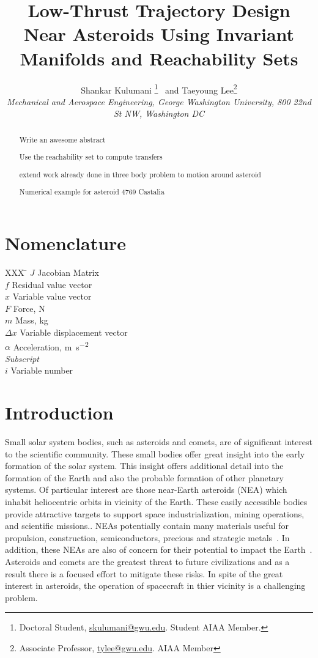 \documentclass[]{aiaa-tc}%
\title{Low-Thrust Trajectory Design Near Asteroids Using Invariant Manifolds and Reachability Sets}
\author{
  Shankar Kulumani\thanksibid{1}%
    \thanks{Doctoral Student, \href{mailto:skulumani@gwu.edu}{skulumani@gwu.edu}. Student AIAA Member.}
  \ and Taeyoung Lee\thanksibid{2}\thanks{Associate Professor, \href{mailto:tylee@gwu.edu}{tylee@gwu.edu}. AIAA Member}\\
  {\normalsize\itshape
   Mechanical and Aerospace Engineering, George Washington University, 800 22nd St NW, Washington DC }\\
   }
\begin{document}
\maketitle

\begin{abstract}
Write an awesome abstract

Use the reachability set to compute transfers

extend work already done in three body problem to motion around asteroid

Numerical example for asteroid 4769 Castalia
\end{abstract}

\section*{Nomenclature}

\begin{tabbing}
  XXX \= \kill%
  $J$ \> Jacobian Matrix \\
  $f$ \> Residual value vector \\
  $x$ \> Variable value vector \\
  $F$ \> Force, \si{\newton} \\
  $m$ \> Mass, \si{\kilo\gram} \\
  $\Delta x$ \> Variable displacement vector \\
  $\alpha$ \> Acceleration, \si{\meter\per\second\squared} \\[5pt]
  \textit{Subscript}\\
  $i$ \> Variable number \\
\end{tabbing}

\section{Introduction}

Small solar system bodies, such as asteroids and comets, are of significant interest to the scientific community.
These small bodies offer great insight into the early formation of the solar system.
This insight offers additional detail into the formation of the Earth and also the probable formation of other planetary systems.
Of particular interest are those near-Earth asteroids (NEA) which inhabit heliocentric orbits in vicinity of the Earth.
These easily accessible bodies provide attractive targets to support space industrialization, mining operations, and scientific missions..
NEAs potentially contain many materials useful for propulsion, construction, semiconductors, precious and strategic metals~\cite{ross2001}.
In addition, these NEAs are also of concern for their potential to impact the Earth~\cite{wie2008}.
Asteroids and comets are the greatest threat to future civilizations and as a result there is a focused effort to mitigate these risks.
In spite of the great interest in asteroids, the operation of spacecraft in thier vicinity is a challenging problem.
\end{document}
